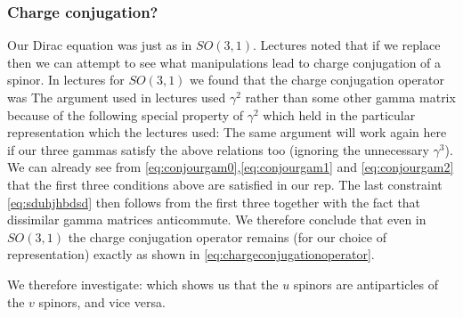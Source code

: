 \subsubsection{Charge conjugation?} 

Our Dirac equation was
just as in $SO(3,1)$.  Lectures noted that if we replace
%
then we can attempt to see what manipulations lead to charge conjugation of a spinor.  In lectures for $SO(3,1)$ we found that the charge conjugation operator was
%
The argument used in lectures used $\gamma^2$ rather than some other gamma matrix because of the following special property of $\gamma^2$ which held in the particular representation which the lectures used:
%
The same argument will work again here if our three gammas satisfy the above relations too (ignoring the unnecessary $\gamma^3$). We can already see from \eqref{eq:conjourgam0},\eqref{eq:conjourgam1} and \eqref{eq:conjourgam2}  that the first three conditions above are satisfied in our rep.  The last constraint \eqref{eq:sduhjhbdsd} then follows from the first three together with the fact that dissimilar gamma matrices anticommute.
We therefore conclude that even in $SO(3,1)$ the charge conjugation operator remains (for our choice of representation) exactly as shown in \eqref{eq:chargeconjugationoperator}.

We therefore investigate:
%
which shows us that the $u$ spinors are antiparticles of the $v$ spinors, and vice versa.

